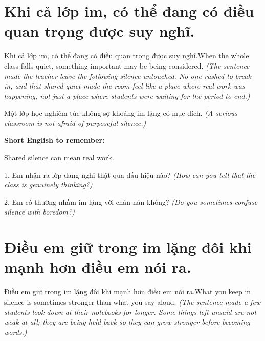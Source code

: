 \section{Khi cả lớp im, có thể đang có điều quan trọng được suy nghĩ.}
\begin{truyen}{Khi cả lớp im, có thể đang có điều quan trọng được suy nghĩ.}{When the whole class falls quiet, something important may be being considered.}
\textit{(The sentence made the teacher leave the following silence untouched. No one rushed to break in, and that shared quiet made the room feel like a place where real work was happening, not just a place where students were waiting for the period to end.)}
\end{truyen}

\begin{baihoc}
Một lớp học nghiêm túc không sợ khoảng im lặng có mục đích.
\textit{(A serious classroom is not afraid of purposeful silence.)}
\end{baihoc}

\begin{ghinhoanh}
\textbf{Short English to remember:}

Shared silence can mean real work.

\end{ghinhoanh}

\begin{tuhocnhanh}
1. Em nhận ra lớp đang nghĩ thật qua dấu hiệu nào? \textit{(How can you tell that the class is genuinely thinking?)}

2. Em có thường nhầm im lặng với chán nản không? \textit{(Do you sometimes confuse silence with boredom?)}
\end{tuhocnhanh}
\ngancach


\section{Điều em giữ trong im lặng đôi khi mạnh hơn điều em nói ra.}
\begin{truyen}{Điều em giữ trong im lặng đôi khi mạnh hơn điều em nói ra.}{What you keep in silence is sometimes stronger than what you say aloud.}
\textit{(The sentence made a few students look down at their notebooks for longer. Some things left unsaid are not weak at all; they are being held back so they can grow stronger before becoming words.)}
\end{truyen}

